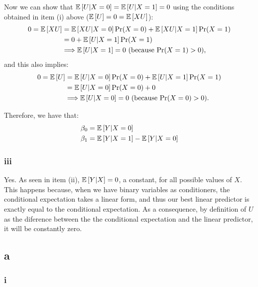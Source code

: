 \documentclass[12pt]{paper}
\begin{document}
Now we can show that $\mathbb{E} \left [ U|X=0 \right ]=\mathbb{E} \left [ U|X=1 \right ]=0$ using the conditions obtained in item (i) above ($\mathbb{E} \left [ U \right ]=0=\mathbb{E} \left [ XU \right ]$):
\begin{equation}
\begin{split}
0=\mathbb{E} \left [ XU \right ]&=\mathbb{E} \left [ XU|X=0 \right ]\Pr(X=0)+\mathbb{E} \left [ XU|X=1 \right ]\Pr(X=1)\\
&=0+\mathbb{E} \left [ U|X=1 \right ]\Pr(X=1)\\
&\Longrightarrow \mathbb{E} \left [ U|X=1 \right ]=0 \text{        (because $\Pr(X=1)>0$)},
\end{split}
\end{equation}
\noindent and this also implies:
\begin{equation}
\begin{split}
0=\mathbb{E} \left [ U \right ]&=\mathbb{E} \left [ U|X=0 \right ]\Pr(X=0)+\mathbb{E} \left [ U|X=1 \right ]\Pr(X=1)\\
&=\mathbb{E} \left [ U|X=0 \right ]\Pr(X=0)+0\\
&\Longrightarrow \mathbb{E} \left [ U|X=0 \right ]=0 \text{        (because $\Pr(X=0)>0$)}.
\end{split}
\end{equation}

Therefore, we have that:
\begin{equation}
\begin{split}
\beta_0&=\mathbb{E} \left [ Y|X=0 \right ]\\
\beta_1&=\mathbb{E} \left [ Y|X=1 \right ]-\mathbb{E} \left [ Y|X=0 \right ]\\
\end{split}
\end{equation}

\subsubsection*{iii}

Yes. As seen in item (ii), $\mathbb{E} \left [ Y|X \right ]=0$, a constant, for all possible values of $X$. This happens because, when we have binary variables as conditioners, the conditional expectation takes a linear form, and thus our best linear predictor is exactly equal to the conditional expectation. As a consequence, by definition of $U$ as the diference between the the conditional expectation and the linear predictor, it will be constantly zero.

\subsection*{a}

\subsubsection*{i}
\end{document}
